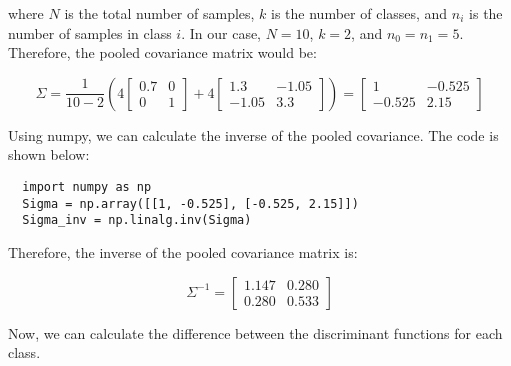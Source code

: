 \documentclass{article}
\begin{document}
where $N$ is the total number of samples, $k$ is the number of classes, and $n_i$ is the number of samples in class $i$. In our case, $N = 10$, $k = 2$, and $n_0 = n_1 = 5$. Therefore, the pooled covariance matrix would be:

\begin{equation}
  \Sigma = \frac{1}{10 - 2} \left( 4 \begin{bmatrix}
    0.7 & 0 \\
    0 & 1
  \end{bmatrix} + 4 \begin{bmatrix}
    1.3 & -1.05 \\
    -1.05 & 3.3
  \end{bmatrix} \right)
  = \begin{bmatrix}
    1 & -0.525 \\
    -0.525 & 2.15
  \end{bmatrix}
\end{equation}

Using numpy, we can calculate the inverse of the pooled covariance. The code is shown below: 

\begin{tcolorbox}

\begin{verbatim}
  import numpy as np
  Sigma = np.array([[1, -0.525], [-0.525, 2.15]])
  Sigma_inv = np.linalg.inv(Sigma)
\end{verbatim}
\end{tcolorbox}

Therefore, the inverse of the pooled covariance matrix is:

\begin{equation}
  \Sigma^{-1} = \begin{bmatrix}
    1.147 & 0.280 \\
    0.280 & 0.533
  \end{bmatrix}
\end{equation}

Now, we can calculate the difference between the discriminant functions for each class. 
\end{document}
